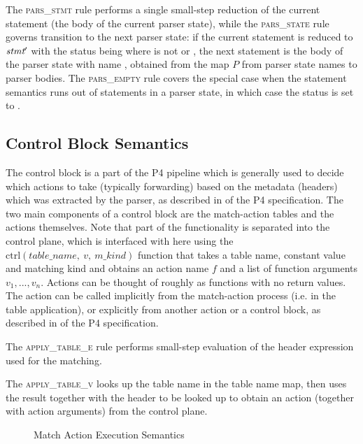 \documentclass[UTF8]{article}
\begin{document}
The \textsc{pars\_stmt} rule performs a single small-step reduction of the current statement (the body of the current parser state), while the \textsc{pars\_state} rule governs transition to the next parser state: if the current statement \stmt{} is reduced to $\textit{stmt}{}'$ with the status being \trans{\vn{}} where \vn{} is not \accept{} or \reject{}, the next statement is the body of the parser state with name \vn{}, obtained from the map $P$ from parser state names to parser bodies. The \textsc{pars\_empty} rule covers the special case when the statement semantics runs out of statements in a parser state, in which case the status is set to \reject{}.

\subsection{Control Block Semantics}
The control block is a part of the P4 pipeline which is generally used to decide which actions to take (typically forwarding) based on the metadata (headers) which was extracted by the parser, as described in  of the P4 specification. The two main components of a control block are the match-action tables and the actions themselves. Note that part of the functionality is separated into the control plane, which is interfaced with here using the $\mathrm{ctrl}(table\_name,\ v,\ m\_kind)$ function that takes a table name, constant value and matching kind and obtains an action name $f$ and a list of function arguments ${v_1}, ..., {v_n}$.
Actions can be thought of roughly as functions with no return values. The action can be called implicitly from the match-action process (i.e. in the table application), or explicitly from another action or a control block, as described in  of the P4 specification.

The \textsc{apply\_table\_e} rule performs small-step evaluation of the header expression used for the matching.

The \textsc{apply\_table\_v} looks up the table name in the table name map, then uses the result together with the header to be looked up to obtain an action (together with action arguments) from the control plane.

\begin{figure}[ht!]
\ottusedrule{\ottdrulestmtXXapplyXXtableXXe{}}
\ottusedrule{\ottdrulestmtXXapplyXXtableXXv{}}
\caption{Match Action Execution Semantics}
\label{fig:semmatchaction}
\end{figure}
\end{document}
